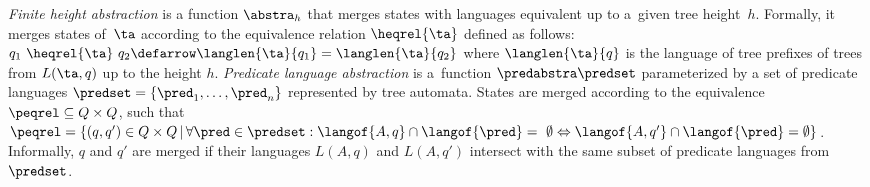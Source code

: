 \emph{Finite height abstraction} 
 is a function $\abstra_h$ that merges states 
 with languages equivalent
up to a~given tree height~$h$.
Formally, it merges states of~$\ta$ according to the equivalence relation $\heqrel{\ta}$ defined as follows:
$q_1~\heqrel{\ta}~q_2 \defarrow \langlen{\ta}{q_1} = \langlen{\ta}{q_2}$ where
$\langlen{\ta}{q}$ is the language of tree prefixes of trees from $L(\ta,q)$  
 up to the height $h$.
%
%
%
\emph{Predicate language abstraction}
is a~function $\predabstra \predset$ parameterized by a set of predicate languages $\predset=\{\pred_1, \ldots, \pred_n\}$
represented by tree automata.
%
States are merged according to the equivalence ${\peqrel} \subseteq Q \times Q$, such that
${\peqrel} = \{(q,q')\in Q\times Q \,|\, \forall \pred \in \predset: \langof{A,q} \cap \langof{\pred} =~\emptyset \Leftrightarrow \langof{A,q'} \cap \langof{\pred} = \emptyset\}$.
Informally, $q$ and $q'$ are merged if their languages $L(A,q)$ and $L(A,q')$ intersect with the same subset of predicate languages from $\predset$.
%




